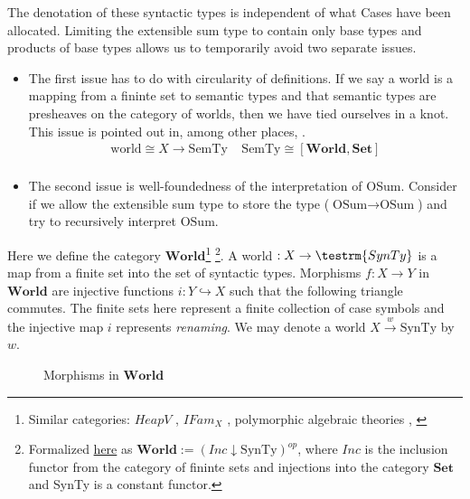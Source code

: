\documentclass{article}
\newcommand{\world}{{\mathbf{World}}}
\begin{document}
The denotation of these syntactic types is independent of what Cases have been allocated.
Limiting the extensible sum type to contain only base types and products of base types allows 
us to temporarily avoid two separate issues. 
\begin{itemize}
    \item The first issue has to do with circularity of definitions. If we say a world is a 
    mapping from a fininte set to semantic types and that semantic types are presheaves on 
    the category of worlds, then we have tied ourselves in a knot. This issue is pointed 
    out in, among other places, \cite{sterling_denotational_2023}.
    \begin{align*}
        \textrm{world} \cong X \rightarrow \textrm{SemTy} \;\;\;\; \textrm{SemTy} \cong [\world , \mathbf{Set}]\\
    \end{align*}
    
    \item The second issue is well-foundedness of the interpretation of OSum. Consider if we allow the extensible 
    sum type to store the type ($\textrm{OSum} \rightarrow \textrm{OSum}$) and try to recursively interpret $\textrm{OSum}$.

\end{itemize}


 Here we define the category $\world$\footnote{Similar categories: $HeapV$ \cite{SIMPSON-Independence}, 
 $IFam_X$ \cite{sterlingFreeTheoremsUnivalent}, polymorphic algebraic theories \cite{fioreMultiversalPolymorphicAlgebraic2013},
 \cite{sterlingSyntaxSemanticsAbstract2016}}
 \footnote{Formalized 
 \href{https://github.com/bond15/Bunched-CBPV/blob/68f8b4d006edc9df1d830d7f9cc63822ec77a379/src/Data/Worlds.agda#L33}{here} 
 as $\world := (Inc \downarrow \textrm{SynTy})^{op}$, where $Inc$ is the inclusion functor from the category of fininte sets 
 and injections into the category $\mathbf{Set}$ and SynTy is a constant functor.}. 
 A world $: X \rightarrow \testrm{SynTy}$ is a map from a finite set into the set of syntactic types. Morphisms $f : X \rightarrow Y$ 
 in $\world$ are injective functions $i : Y \hookrightarrow X$ such that the 
 following triangle commutes. The finite sets here represent a finite 
 collection of case symbols and the injective map $i$ represents \textit{renaming}. We may denote a world $X \xrightarrow{w} \textrm{SynTy}$ 
 by $w$.
 

\begin{figure}[!ht]
    \centering
\caption{Morphisms in $\world$}
\end{figure}
 
\end{document}
